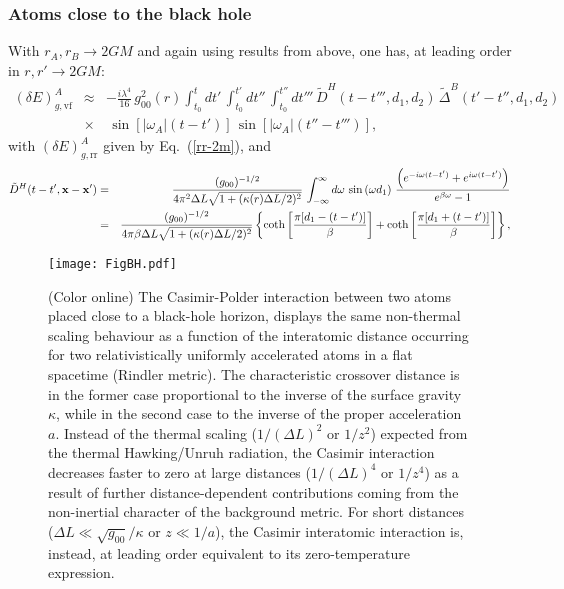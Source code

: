 \documentclass[twocolumn,prd,aps,showpacs,amsmath,amssymb]{revtex4-1}
\def\bea{\begin{eqnarray}}
\def\eea{\end{eqnarray}}
\def\nn{\nonumber}
\begin{document}
\subsubsection{Atoms close to the black hole}

\begin{widetext}
With $r_{A}, r_{B} \to 2GM$ and again using results from above, one has, at leading order in $r,r'\to2GM$:
%
\bea
(\delta E)^{A}_{g,\textrm{vf}} &\approx& -\frac{i\lambda^4}{16}\,g_{00}^2(r)
\int_{t_0}^{t}dt'\,\int_{t_0}^{t'}dt''\,\int_{t_0}^{t''}dt'''\,
\tilde{D}^{H}(t-t''',d_1,d_2)\,\tilde{\Delta}^{B}(t'-t'',d_1,d_2)
\nn\\
&\times&\,\sin[|\omega_{A}|(t - t')]\,\sin[|\omega_{A}|(t'' - t''')],
\label{vfhh-2m}
\eea
%
with $(\delta E)^{A}_{g,\textrm{rr}}$  given by Eq.~(\ref{rr-2m}), and
%
\bea
\tilde{D}^{H}(t-t',{\bf x}-{\bf x}') &=& \frac{(g_{00})^{-1/2}}{4\pi^2\Delta L\sqrt{1 + (\kappa(r) \Delta L/2)^2}}
\,\int_{-\infty}^{\infty} d\omega\,\sin\left(\omega d_{1}\right)\,\frac{\left(e^{-i\omega(t-t')} + e^{i\omega(t-t')}\right)}{e^{\beta\omega} - 1}
\nn\\
&=& \frac{(g_{00})^{-1/2}}{4\pi\beta\Delta L\sqrt{1 + (\kappa(r) \Delta L/2)^2}}
\left\{\coth\left[\frac{\pi[d_1 - (t-t')]}{\beta }\right] + \coth\left[\frac{\pi[d_1 + (t-t')]}{\beta }\right]\right\},
\label{haw-hada-2m}
\eea
%
\end{widetext}
\begin{figure}[t!]
\texttt{[image: FigBH.pdf]}
\caption{(Color online) The  Casimir-Polder interaction between two
  atoms placed close to a black-hole horizon, displays the same
  non-thermal scaling behaviour as a function of the interatomic
  distance occurring for two relativistically uniformly accelerated
  atoms in a flat spacetime \cite{marino} (Rindler metric). The
  characteristic crossover distance is in the former case proportional
  to the inverse of the surface gravity $\kappa$, while in the second
  case to the inverse of the proper acceleration $a$. Instead of the
  thermal scaling ($1/(\Delta L)^2$ or $1/z^2$) expected from the
  thermal Hawking/Unruh radiation, the Casimir interaction decreases
  faster to zero at large distances ($1/(\Delta L)^4$ or $1/z^4$) as a
  result of further distance-dependent contributions coming from the
  non-inertial character of the background metric. For short distances
  ($\Delta L \ll \sqrt{g_{00}}/\kappa$ or $z\ll 1/a$), the Casimir
  interatomic interaction is, instead, at leading order equivalent to
  its zero-temperature expression.}  
\label{figureBH}
\end{figure}
\end{document}
